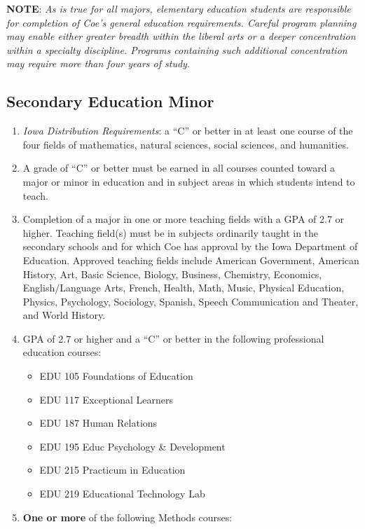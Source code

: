 \documentclass[
  letterpaper,
]{scrbook}
\providecommand{\tightlist}{%
  \setlength{\itemsep}{0pt}\setlength{\parskip}{0pt}}
\begin{document}
\textbf{NOTE}: \emph{As is true for all majors, elementary education
students are responsible for completion of Coe's general education
requirements. Careful program planning may enable either greater breadth
within the liberal arts or a deeper concentration within a specialty
discipline. Programs containing such additional concentration may
require more than four years of study.}

\subsection{Secondary Education Minor}\label{secondary-education-minor}

\begin{enumerate}
\def\labelenumi{\arabic{enumi}.}
\tightlist
\item
  \emph{Iowa Distribution Requirements}: a ``C'' or better in at least
  one course of the four fields of mathematics, natural sciences, social
  sciences, and humanities.
\item
  A grade of ``C'' or better must be earned in all courses counted
  toward a major or minor in education and in subject areas in which
  students intend to teach.
\item
  Completion of a major in one or more teaching fields with a GPA of 2.7
  or higher. Teaching field(s) must be in subjects ordinarily taught in
  the secondary schools and for which Coe has approval by the Iowa
  Department of Education. Approved teaching fields include American
  Government, American History, Art, Basic Science, Biology, Business,
  Chemistry, Economics, English/Language Arts, French, Health, Math,
  Music, Physical Education, Physics, Psychology, Sociology, Spanish,
  Speech Communication and Theater, and World History.
\item
  GPA of 2.7 or higher and a ``C'' or better in the following
  professional education courses:

  \begin{itemize}
  \tightlist
  \item
    EDU 105 Foundations of Education
  \item
    EDU 117 Exceptional Learners
  \item
    EDU 187 Human Relations
  \item
    EDU 195 Educ Psychology \& Development
  \item
    EDU 215 Practicum in Education
  \item
    EDU 219 Educational Technology Lab
  \end{itemize}
\item
  \textbf{One or more} of the following Methods courses:


\end{enumerate}
\end{document}
